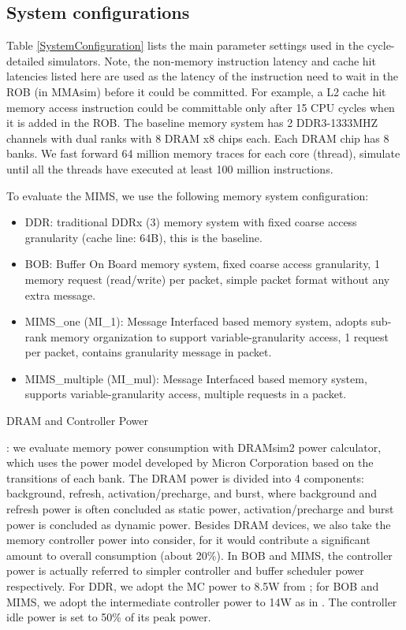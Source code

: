 \documentclass[pageno]{jpaper}
\begin{document}
\subsection {System configurations}

Table \ref{SystemConfiguration} lists the main parameter settings used in the cycle-detailed simulators. Note, the non-memory instruction latency and cache hit latencies listed here are used as the latency of the instruction need to wait in the ROB (in MMAsim) before it could be committed. For example, a L2 cache hit memory access instruction could be committable only after 15 CPU cycles when it is added in the ROB. The baseline memory system has 2 DDR3-1333MHZ channels with dual ranks with 8 DRAM x8 chips each. Each DRAM chip has 8 banks. We fast forward 64 million memory traces for each core (thread), simulate until all the threads have executed at least 100 million instructions.

To evaluate the MIMS, we use the following memory system configuration:

\begin{itemize}
\item DDR: traditional DDRx (3) memory system with fixed coarse access granularity (cache line: 64B), this is the baseline.
\item BOB: Buffer On Board memory system, fixed coarse access granularity, 1 memory request (read/write) per packet, simple packet format without any extra message.
\item MIMS\_one (MI\_1): Message Interfaced based memory system, adopts sub-rank memory organization to support variable-granularity access, 1 request per packet, contains granularity message in packet.
\item MIMS\_multiple (MI\_mul): Message Interfaced based memory system, supports variable-granularity access, multiple requests in a packet.
\end{itemize}

\begin{bfseries}DRAM and Controller Power\end{bfseries}: we evaluate memory power consumption with DRAMsim2 \cite{DRAMSim2} power calculator, which uses the power model developed by Micron Corporation based on the transitions of each bank. The DRAM power is divided into 4 components: background, refresh, activation/precharge, and burst, where background and refresh power is often concluded as static power, activation/precharge and burst power is concluded as dynamic power. Besides DRAM devices, we also take the memory controller power into consider, for it would contribute a significant amount to overall consumption \cite{MemScalePower} (about 20\%). In BOB and MIMS, the controller power is actually referred to simpler controller and buffer scheduler power respectively. For DDR, we adopt the MC power to 8.5W from \cite{AMDPower}; for BOB and MIMS, we adopt the intermediate controller power to 14W as in \cite{BOBMemory}. The controller idle power is set to 50\% of its peak power.
\end{document}
